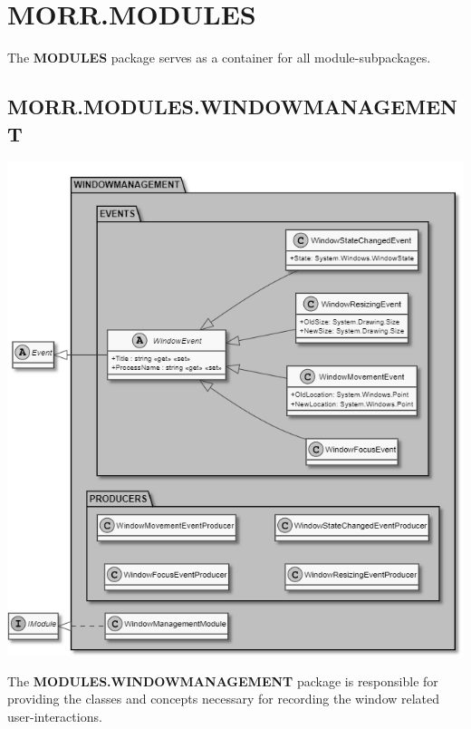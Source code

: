 \newpage
\section{MORR.MODULES}

The \textbf{MODULES} package serves as a container for all module-subpackages.

\begin{packpack}
\end{packpack}

\subsection*{MORR.MODULES.WINDOWMANAGEMENT}

\begin{center}
    \includegraphics[width=1.0\textwidth]{resources/Packages/MODULES_WINDOWMANAGEMENT.png}
\end{center}

The \textbf{MODULES.WINDOWMANAGEMENT} package is responsible for providing the classes and concepts necessary for recording the window related user-interactions.

